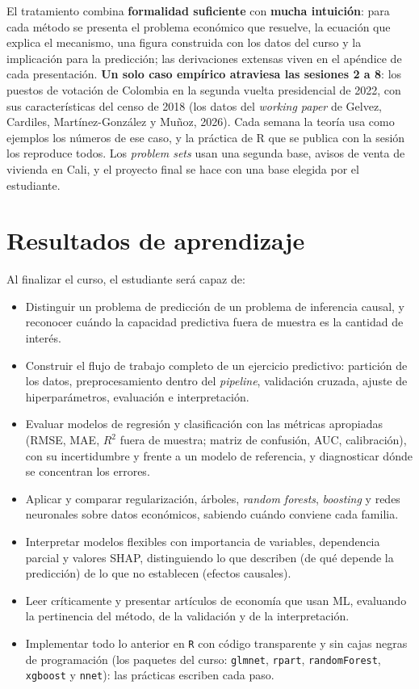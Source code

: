 \documentclass[12pt,a4paper]{article}
\begin{document}
El tratamiento combina \textbf{formalidad suficiente} con \textbf{mucha intuición}: para cada método se presenta el problema económico que resuelve, la ecuación que explica el mecanismo, una figura construida con los datos del curso y la implicación para la predicción; las derivaciones extensas viven en el apéndice de cada presentación. \textbf{Un solo caso empírico atraviesa las sesiones 2 a 8}: los puestos de votación de Colombia en la segunda vuelta presidencial de 2022, con sus características del censo de 2018 (los datos del \emph{working paper} de Gelvez, Cardiles, Martínez-González y Muñoz, 2026). Cada semana la teoría usa como ejemplos los números de ese caso, y la práctica de R que se publica con la sesión los reproduce todos. Los \emph{problem sets} usan una segunda base, avisos de venta de vivienda en Cali, y el proyecto final se hace con una base elegida por el estudiante.

\section{Resultados de aprendizaje}

Al finalizar el curso, el estudiante será capaz de:

\begin{itemize}
    \item Distinguir un problema de predicción de un problema de inferencia causal, y reconocer cuándo la capacidad predictiva fuera de muestra es la cantidad de interés.
    \item Construir el flujo de trabajo completo de un ejercicio predictivo: partición de los datos, preprocesamiento dentro del \emph{pipeline}, validación cruzada, ajuste de hiperparámetros, evaluación e interpretación.
    \item Evaluar modelos de regresión y clasificación con las métricas apropiadas (RMSE, MAE, $R^2$ fuera de muestra; matriz de confusión, AUC, calibración), con su incertidumbre y frente a un modelo de referencia, y diagnosticar dónde se concentran los errores.
    \item Aplicar y comparar regularización, árboles, \emph{random forests}, \emph{boosting} y redes neuronales sobre datos económicos, sabiendo cuándo conviene cada familia.
    \item Interpretar modelos flexibles con importancia de variables, dependencia parcial y valores SHAP, distinguiendo lo que describen (de qué depende la predicción) de lo que no establecen (efectos causales).
    \item Leer críticamente y presentar artículos de economía que usan ML, evaluando la pertinencia del método, de la validación y de la interpretación.
    \item Implementar todo lo anterior en \texttt{R} con código transparente y sin cajas negras de programación (los paquetes del curso: \texttt{glmnet}, \texttt{rpart}, \texttt{randomForest}, \texttt{xgboost} y \texttt{nnet}): las prácticas escriben cada paso.
\end{itemize}
\end{document}
